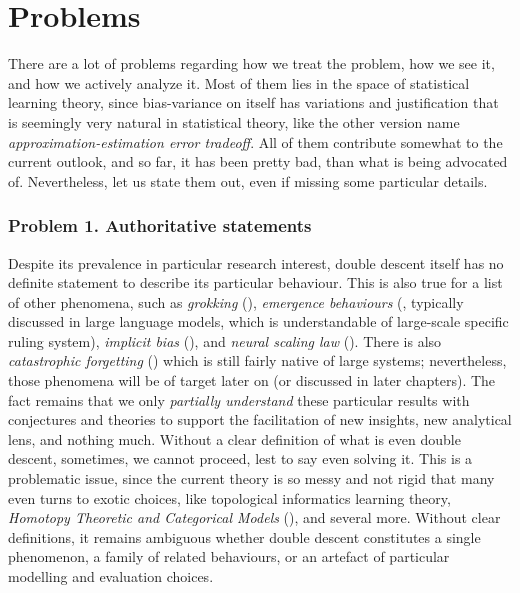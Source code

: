 \section{Problems}
There are a lot of problems regarding how we treat the problem, how we see it, and how we actively analyze it. Most of them lies in the space of statistical learning theory, since bias-variance on itself has variations and justification that is seemingly very natural in statistical theory, like the other version name \textit{approximation-estimation error tradeoff}. All of them contribute somewhat to the current outlook, and so far, it has been pretty bad, than what is being advocated of. Nevertheless, let us state them out, even if missing some particular details. 

\subsubsection*{Problem 1. Authoritative statements}
Despite its prevalence in particular research interest, double descent itself has no definite statement to describe its particular behaviour. This is also true for a list of other phenomena, such as \textit{grokking} (\cite{power2022grokkinggeneralizationoverfittingsmall}), \textit{emergence behaviours} (\cite{wei2022emergentabilitieslargelanguage}, typically discussed in large language models, which is understandable of large-scale specific ruling system), \textit{implicit bias} (\cite{soudry2024implicitbiasgradientdescent}), and \textit{neural scaling law} (\cite{kaplan2020scalinglawsneurallanguage,wei2022emergentabilitieslargelanguage}). There is also \textit{catastrophic forgetting} (\cite{vandeven2024continuallearningcatastrophicforgetting}) which is still fairly native of large systems; nevertheless, those phenomena will be of target later on (or discussed in later chapters). The fact remains that we only \textit{partially understand} these particular results with conjectures and theories to support the facilitation of new insights, new analytical lens, and nothing much. Without a clear definition of what is even double descent, sometimes, we cannot proceed, lest to say even solving it. This is a problematic issue, since the current theory is so messy and not rigid that many even turns to exotic choices, like topological informatics learning theory, \textit{Homotopy Theoretic and Categorical Models} (\cite{Manin_2024}), and several more. Without clear definitions, it remains ambiguous whether double descent constitutes a single phenomenon, a family of related behaviours, or an artefact of particular modelling and evaluation choices. 

